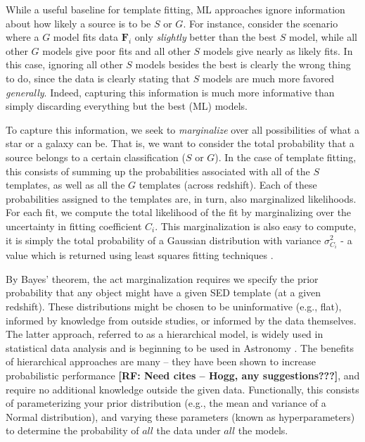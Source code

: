 \documentclass[12pt,preprint]{aastex}
\newcommand{\datavector}[1]{\boldsymbol{#1}}
\newcommand\rf[1]{{\bf [RF: #1]}}
\begin{document}
While a useful baseline for template 
fitting, ML approaches ignore information about how likely a source is to be 
$S$ or $G$.  For instance, consider the scenario where a $G$ model fits data 
$\datavector{F}_i$ only \textit{slightly} better than the best $S$ model, while all 
other $G$ models give poor fits and all other $S$ models give nearly as likely 
fits.  In this case, ignoring all other $S$ models besides the best is clearly the 
wrong thing to do, since the data is clearly stating that $S$ models are much 
more favored \textit{generally}.  Indeed, capturing this information is 
much more informative than simply discarding everything but the 
best (ML) models. 

To capture this information, we seek to \textit{marginalize} over all possibilities 
of what a star or a galaxy can be.  That is, we want to consider the total probability 
that a source belongs to a certain classification ($S$ or $G$).  In the case of template 
fitting, this consists of summing up the probabilities associated with all of the $S$ 
templates, as well as all the $G$ templates (across redshift).  Each of these probabilities 
assigned to the templates are, in turn, also marginalized likelihoods.  For each fit, we 
compute the total likelihood of the fit by marginalizing over the uncertainty in fitting 
coefficient $C_i$.  This marginalization is also easy to compute, it is simply the total 
probability of a Gaussian distribution with variance $\sigma_{C_i}^2$ - a value which 
is returned using least squares fitting techniques \citep[e.g.,][]{hogg10}.

By Bayes' theorem, the act marginalization requires we specify the prior probability 
that any object might have a given SED template (at a given redshift).  These 
distributions might be chosen to be uninformative (e.g., flat), informed by knowledge 
from outside studies, or informed by the data themselves.   The latter approach, 
referred to as a hierarchical model, is widely used in statistical data analysis \citep[e.g.,][]{gelman03} and is 
beginning to be used in Astronomy \citep{shu12}.  The benefits of hierarchical 
approaches are many -- they have been shown to increase probabilistic performance 
\rf{Need cites -- Hogg, any suggestions???}, and require no additional knowledge outside the given data.  Functionally, 
this consists of parameterizing your prior distribution (e.g., the mean and variance of a 
Normal distribution), and varying these parameters (known as hyperparameters) 
to determine the probability of $all$ the data under $all$ the models.  
\end{document}
